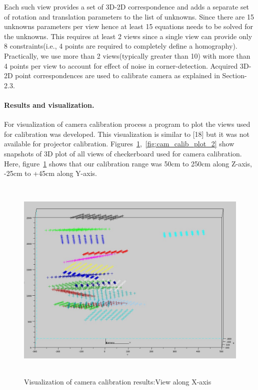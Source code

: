 Each such view provides a set of 3D-2D correspondence and adds a separate set of rotation and translation parameters to the  
list of unknowns. Since there are 15 unknowns parameters per view hence at least 15 equations needs to be solved for the unknowns. This requires at least 2 views since a single view can provide only 8 constraints(i.e., 4 points are required to completely define a homography). Practically, we use more than 2 views(typically greater than 10) with more than  
4 points per view to account for effect of noise in corner-detection. Acquired 3D-2D point  
correspondences are used to calibrate camera as explained in Section-2.3.  
  
\paragraph{Results and visualization.}  
For visualization of camera calibration process a program to plot the  
views used for calibration was developed. This visualization is similar to [18] but it was not available  
for projector calibration.\newline  
Figures~\ref{fig:cam_calib_plot_1},~\ref{fig:cam_calib_plot_2} show snapshots of 3D plot of all views of checkerboard used for camera  
calibration.  
\noindent  
Here, figure~\ref{fig:cam_calib_plot_1} shows that our calibration range was 50cm to 250cm along Z-axis, -25cm to +45cm along Y-axis.  
\begin{figure}[htbp]  
\centering  
\includegraphics[width=15cm,height=10cm]{../img_source/cam_calib_view.jpg}  
\caption{Visualization of camera calibration results:View along X-axis}  
\label{fig:cam_calib_plot_1}
\end{figure}  
